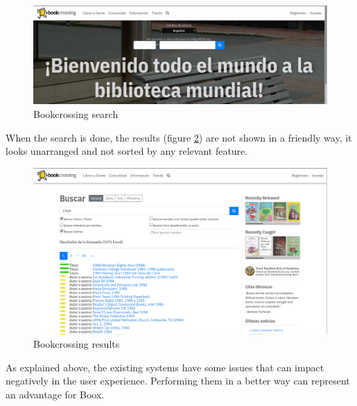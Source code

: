 \documentclass{article}
\begin{document}
\begin{figure}[h]
    \centering
    \includegraphics[scale=0.2]{img/bookcrossing1.png}
    \caption{Bookcrossing search}
    \label{fig:bookcrossing1}
\end{figure}

When the search is done, the results (figure \ref{fig:bookcrossing2}) are not shown in a friendly way, it looks unarranged and not sorted by any relevant feature.

\begin{figure}[h]
    \centering
    \includegraphics[scale=0.2]{img/bookcrosing_search.png}
    \caption{Bookcrossing results}
    \label{fig:bookcrossing2}
\end{figure}

As explained above, the existing systems have some issues that can impact negatively in the user experience. Performing them in a better way can represent an advantage for Boox.
\end{document}
